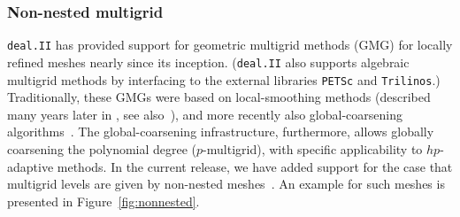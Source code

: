 \documentclass{ansarticle-preprint}
\newcommand{\specialword}[1]{\texttt{#1}}
\newcommand{\dealii}{{\specialword{deal.II}}\xspace}
\newcommand{\trilinos}{{\specialword{Trilinos}}\xspace}
\newcommand{\petsc}{\specialword{PETSc}\xspace}
\begin{document}
\subsubsection{Non-nested multigrid}

\dealii has provided support for geometric multigrid methods (GMG)
for locally refined meshes nearly since its inception. (\dealii{} also
supports algebraic multigrid methods by interfacing to the external
libraries \petsc and \trilinos.)
Traditionally, these GMGs were based on local-smoothing
methods (described many years later in \cite{Kanschat2004,JanssenKanschat2011}, see
also~\cite{ClevengerHeisterKanschatKronbichler2019}), and more
recently also global-coarsening algorithms~\cite{munch2022gc}. The global-coarsening
infrastructure, furthermore, allows globally coarsening the polynomial degree ($p$-multigrid),
with specific applicability to $hp$-adaptive methods.
In the current release, we have added support for the case
that multigrid levels are given by non-nested meshes~\cite{adams2002evaluation, bittencourt2001nonnested, bramble1991analysis}. An example for such meshes is
presented in Figure~\ref{fig:nonnested}.
\end{document}
